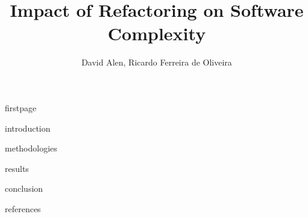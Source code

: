 \documentclass[12pt]{article}
\title{Impact of Refactoring on Software Complexity}
\author{David Alen\inst{1}, Ricardo Ferreira de Oliveira\inst{1}}
\begin{document}
{firstpage}

{introduction}

{methodologies}

{results}

{conclusion}

{references}
\end{document}
